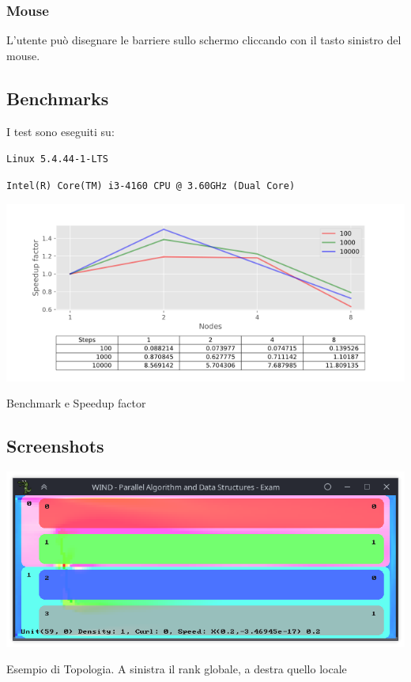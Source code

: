 \documentclass[12pt]{article}
\begin{document}
\subsubsection{Mouse}
L'utente può disegnare le barriere sullo schermo cliccando con il tasto sinistro del mouse.


\subsection{Benchmarks}
I test sono eseguiti su: \\

\begin{left}
    \verb|Linux 5.4.44-1-LTS|
\end{left}

\begin{left}
    \verb|Intel(R) Core(TM) i3-4160 CPU @ 3.60GHz (Dual Core)|
\end{left}


\begin{center}
    \centering
    \includegraphics[scale=0.75]{bench}
    \caption{Benchmark e Speedup factor}
    \label{fig:bench}
\end{center}




\subsection{Screenshots}



\begin{center}
    \centering
    \includegraphics[scale=0.75]{7}
    \caption{Esempio di Topologia. A sinistra il rank globale, a destra quello locale}
    \label{fig:screen0}
\end{center}
\end{document}
